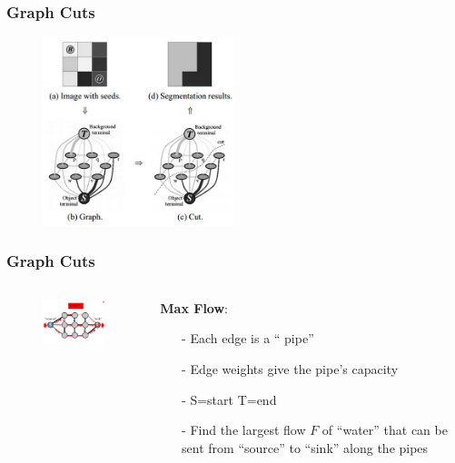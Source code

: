 \documentclass[notheorems,mathserif,table,compress]{beamer}  %
\begin{document}
\begin{frame}
\frametitle{Graph Cuts}
  \begin{figure}[!ht]
  \centering
   \includegraphics[width=2.2in]{graphcut.png}
   \end{figure}
\end{frame}


\begin{frame}
\frametitle{Graph Cuts}
\begin{columns}
\begin{column}[c]{0.5\textwidth}
       \begin{figure}[!ht]
       \centering
       \includegraphics[width=1.9in]{maxflow.png}
       \end{figure}
\end{column}

\begin{column}[c]{0.5\textwidth}
\textbf{Max Flow}:
\begin{itemize}
\item[-] Each edge is a ``{\color{blue} pipe}''
\item[-] Edge {\color{blue} weights} give the pipe's {\color{blue} capacity}
\item[-] S=start  \hspace{0.1in} T=end
\item[-] Find the {\color{blue} largest flow} $F$ of ``water'' that can be sent from ``source'' to ``sink'' along the pipes
\end{itemize}
      \end{column}
 \end{columns}  
\end{frame}
\end{document}
